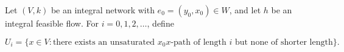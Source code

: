 Let $(V, k)$ be an integral network with $e_0 = (y_0, x_0) \in W$, and let $h$ be an integral feasible flow. For $i = 0, 1, 2, \ldots$, define

$$U_i = \{x \in V : \text{there exists an unsaturated } x_0x\text{-path of length } i \text{ but none of shorter length}\}.$$
